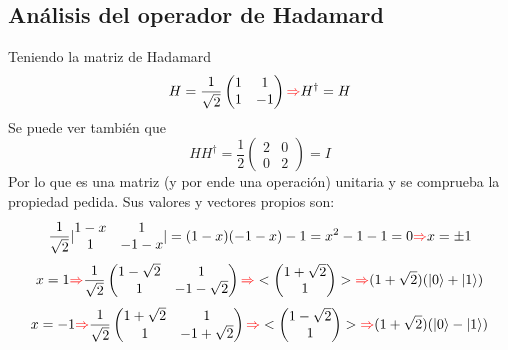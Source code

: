 \documentclass{book}
\begin{document}
\subsection{Análisis del operador de Hadamard} Teniendo la matriz de Hadamard
$$ H= \frac{1}{\sqrt{2}}\begin{pmatrix} 1 & 1 \\ 1 & -1\end{pmatrix} \textcolor{red}{\Rightarrow} H^\dag=H$$
Se puede ver también que 
$$ HH^\dag=\frac{1}{2}\begin{pmatrix} 2& 0 \\ 0 & 2\end{pmatrix}= I $$
Por lo que es una matriz (y por ende una operación) unitaria y se comprueba la propiedad pedida. Sus valores y vectores propios son:
$$ \frac{1}{\sqrt{2}}|\begin{matrix} 1-x & 1\\ 1& -1-x \end{matrix}|= (1-x)(-1-x)-1=x^2-1-1=0\textcolor{red}{\Rightarrow} x=\pm 1$$
$$ x=1 \textcolor{red}{\Rightarrow} \frac{1}{\sqrt{2}}\begin{pmatrix} 1-\sqrt{2} & 1\\ 1 & -1-\sqrt{2}\\ \end{pmatrix}\textcolor{red}{\Rightarrow} <\begin{pmatrix} 1+\sqrt{2} \\ 1 \end{pmatrix}> \textcolor{red}{\Rightarrow} (1+\sqrt{2})(\ket{0}+\ket{1})$$
$$ x=-1 \textcolor{red}{\Rightarrow} \frac{1}{\sqrt{2}}\begin{pmatrix}1+\sqrt{2} & 1\\ 1&  -1+\sqrt{2}\\ \end{pmatrix}\textcolor{red}{\Rightarrow} <\begin{pmatrix} 1-\sqrt{2} \\ 1 \end{pmatrix}> \textcolor{red}{\Rightarrow} (1+\sqrt{2})(\ket{0}-\ket{1})$$
\end{document}
